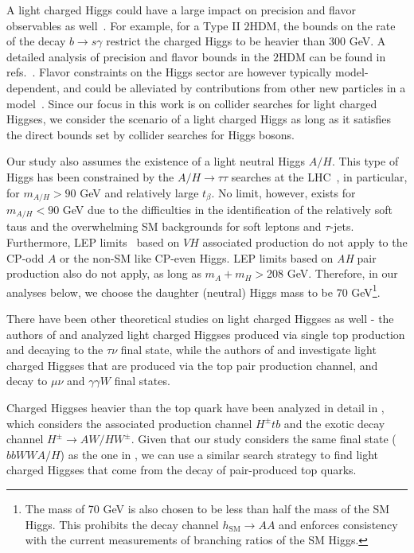 A light charged Higgs could have a large impact on precision and flavor observables as well~\cite{Olive2016}. For example, for a Type II $2$HDM, the bounds on the rate of the decay $b\rightarrow s\gamma$ restrict the charged Higgs to be heavier than 300 GeV. A detailed analysis of precision and flavor bounds in the $2$HDM can be found in refs.~\cite{Coleppa:2013dya,Mahmoudi:2009zx}. Flavor constraints on the Higgs sector are however typically model-dependent, and could be alleviated by contributions from other new particles in a model~\cite{Han:2013mga}. Since our focus in this work is on collider searches for light charged Higgses, we consider the scenario of a light charged Higgs as long as it satisfies the direct bounds set by collider searches for Higgs bosons.

Our study also assumes the existence of a light neutral Higgs $A/H$. This type of Higgs has been constrained by the $A/H \rightarrow \tau\tau$ searches at the LHC~\cite{Khachatryan:2014wca,Aad:2014vgg}, in particular, for $m_{A/H}>90$ GeV and relatively large $t_{\beta}$. No limit, however, exists for $m_{A/H}<90$ GeV due to the difficulties in the identification of the relatively soft taus and the overwhelming SM backgrounds for soft leptons and $\tau$-jets. Furthermore, LEP limits~\cite{LEP_Higgs} based on $VH$ associated production do not apply to the CP-odd $A$ or the non-SM like CP-even Higgs. LEP limits based on \emph{AH} pair production also do not apply, as long as $m_A+m_H>$208 GeV. Therefore, in our analyses below, we choose the daughter (neutral) Higgs mass to be 70 GeV\footnote{The mass of 70 GeV is also chosen to be less than half the mass of the SM Higgs. This prohibits the decay channel $h_\text{SM} \rightarrow AA$ and enforces consistency with the current measurements of branching ratios of the SM Higgs.}.

There have been other theoretical studies on light charged Higgses as well - the authors of \cite{Guedes:2012eu} and \cite{Hashemi:2013kga} analyzed light charged Higgses produced via single top production and decaying to the $\tau\nu$ final state, while the authors of \cite{Hashemi:2011gy} and \cite{Das:2014fha} investigate light charged Higgses that are produced via the top pair production channel, and decay to $\mu\nu$ and $\gamma\gamma W$ final states. 

Charged Higgses heavier than the top quark have been analyzed in detail in \cite{Coleppa:2014cca}, which considers the associated production channel $H^{\pm} tb$ and the exotic decay channel $H^{\pm}\rightarrow AW/HW^{\pm}$. Given that our study considers the same final state ($bbWWA/H$) as the one in \cite{Coleppa:2014cca}, we can use a similar search strategy to find light charged Higgses that come from the decay of pair-produced top quarks.

